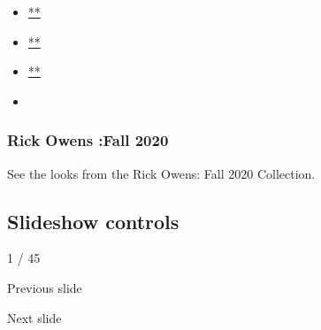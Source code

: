 \begin{itemize}
\item
  \href{https://www.facebookcorewwwi.onion/sharer.php?app_id=9869919170\&u=https\%3A\%2F\%2Fwww.nytimes3xbfgragh.onion\%2Fslideshow\%2F2020\%2F02\%2F27\%2Ffashion\%2Frunway-womens\%2Frick-owens-fall-2020.html\%3Fsmid\%3Dfb-share\&name=Rick\%20Owens\%20\%3AFall\%202020\&redirect_uri=https\%3A\%2F\%2Fwww.facebookcorewwwi.onion\%2F}{**}
\item
  \href{https://twitter.com/intent/tweet?url=https\%3A\%2F\%2Fwww.nytimes3xbfgragh.onion\%2Fslideshow\%2F2020\%2F02\%2F27\%2Ffashion\%2Frunway-womens\%2Frick-owens-fall-2020.html\%3Fsmid\%3Dtw-share\&text=Rick\%20Owens\%20\%3AFall\%202020}{**}
\item
  \href{mailto:?subject=nytimes3xbfgragh.onion\%3A\%20Rick\%20Owens\%20\%3AFall\%202020\&body=From\%20The\%20New\%20York\%20Times\%3A\%0A\%0ARick\%20Owens\%20\%3AFall\%202020\%0A\%0ASee\%20the\%20looks\%20from\%20the\%20Rick\%20Owens\%3A\%20Fall\%202020\%20Collection.\%0A\%0Ahttps\%3A\%2F\%2Fwww.nytimes3xbfgragh.onion\%2Fslideshow\%2F2020\%2F02\%2F27\%2Ffashion\%2Frunway-womens\%2Frick-owens-fall-2020.html\%3Fsmid\%3Dem-share}{**}
\item
\end{itemize}

\hypertarget{rick-owens-fall-2020-1}{%
\subsubsection{Rick Owens :Fall 2020}\label{rick-owens-fall-2020-1}}

See the looks from the Rick Owens: Fall 2020 Collection.

\hypertarget{slideshow-controls}{%
\subsection{Slideshow controls}\label{slideshow-controls}}

1 / 45

Previous slide

Next slide
